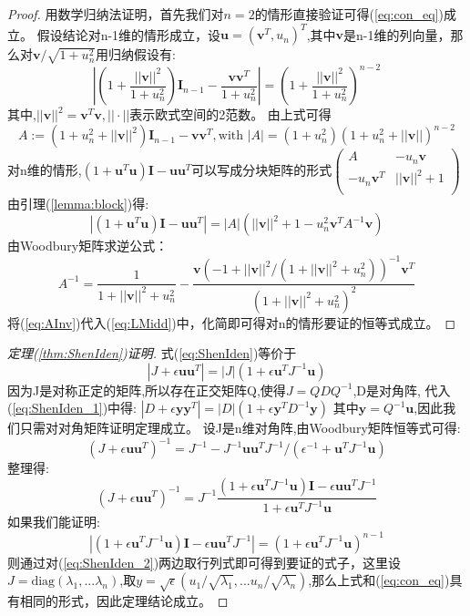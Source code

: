 \begin{proof}
用数学归纳法证明，首先我们对$n=2$的情形直接验证可得(\ref{eq:con_eq})成立。
假设结论对n-1维的情形成立，设$\bm{u}=(\bm{v}^T,u_n)^T$,其中$\bm{v}$是n-1维的列向量，那么对$\bm{v}/\sqrt{1+u_n^2}$用归纳假设有:
\begin{equation}
|(1+\frac{||\bm{v}||^2}{1+u_n^2})\bm{I}_{n-1}-\frac{\bm{v}\bm{v}^T}{1+u_n^2}|=(1+\frac{||\bm{v}||^2}{1+u_n^2})^{n-2}
\end{equation}
其中,$||\bm{v}||^2=\bm{v}^T\bm{v},||\cdot||$表示欧式空间的2范数。
由上式可得
\begin{equation}
A:=(1+u_n^2+||\bm{v}||^2)\bm{I}_{n-1}-\bm{v}\bm{v}^T,\text{with }|A|=(1+u_n^2)(1+u_n^2+||\bm{v}||)^{n-2}
\end{equation}
对n维的情形,$(1+\bm{u}^T\bm{u})\bm{I}-\bm{u}\bm{u}^T$可以写成分块矩阵的形式$\left(\begin{array}{cc}
A&-u_n\bm{v}\\
-u_n\bm{v}^T&||\bm{v}||^2+1\\
\end{array}\right)$
由引理(\ref{lemma:block})得:
\begin{equation}\label{eq:LMidd}
|(1+\bm{u}^T\bm{u})\bm{I}-\bm{u}\bm{u}^T|=|A|(||\bm{v}||^2+1-u_n^2 \bm{v}^TA^{-1}\bm{v})
\end{equation}
由Woodbury矩阵求逆公式：
\begin{equation}\label{eq:AInv}
A^{-1}=\frac{1}{1+||\bm{v}||^2+u_n^2}-\frac{\bm{v}(-1+||\bm{v}||^2/(1+||\bm{v}||^2+u_n^2))^{-1}\bm{v}^T}{(1+||\bm{v}||^2+u_n^2)^2}
\end{equation}
将(\ref{eq:AInv})代入(\ref{eq:LMidd})中，化简即可得对n的情形要证的恒等式成立。
\end{proof}
\begin{proof}[定理(\ref{thm:ShenIden})证明]
式(\ref{eq:ShenIden})等价于
\begin{equation}\label{eq:ShenIden_1}
|J+\epsilon \bm{u}\bm{u}^T|=|J|(1+\epsilon \bm{u}^TJ^{-1}\bm{u})
\end{equation}
因为J是对称正定的矩阵,所以存在正交矩阵Q,使得$J=QDQ^{-1}$,D是对角阵,
代入(\ref{eq:ShenIden_1})中得:
$|D+\epsilon \bm{y}\bm{y}^T|=|D|(1+\epsilon \bm{y}^TD^{-1}\bm{y})$
其中$\bm{y}=Q^{-1}\bm{u}$,因此我们只需对对角矩阵证明定理成立。
设J是n维对角阵,由Woodbury矩阵恒等式可得:
\begin{equation}
(J+\epsilon \bm{u}\bm{u}^T)^{-1}=J^{-1}-J^{-1}\bm{u}\bm{u}^TJ^{-1}/(\epsilon^{-1}+\bm{u}^TJ^{-1}\bm{u})
\end{equation}
整理得:
\begin{equation}\label{eq:ShenIden_2}
(J+\epsilon \bm{u}\bm{u}^T)^{-1}=J^{-1}\frac{(1+\epsilon\bm{u}^TJ^{-1}\bm{u})\bm{I}-\epsilon \bm{u}\bm{u}^TJ^{-1}}{1+\epsilon\bm{u}^TJ^{-1}\bm{u}}
\end{equation}
如果我们能证明:
\begin{equation}
|(1+\epsilon\bm{u}^TJ^{-1}\bm{u})\bm{I}-\epsilon \bm{u}\bm{u}^TJ^{-1}|=(1+\epsilon\bm{u}^TJ^{-1}\bm{u})^{n-1}
\end{equation}
则通过对(\ref{eq:ShenIden_2})两边取行列式即可得到要证的式子，这里设$J=\text{diag}(\lambda_1,...\lambda_n)$,取$y=\sqrt{\epsilon}(u_1/\sqrt{\lambda_1},...u_n/\sqrt{\lambda_n})$,那么上式和(\ref{eq:con_eq})具有相同的形式，因此定理结论成立。
\end{proof}
